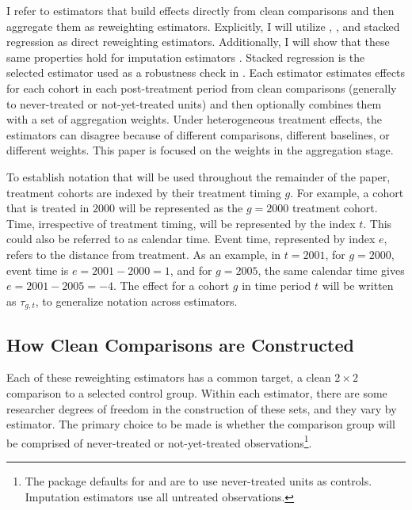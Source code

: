 \documentclass[12pt]{article}
\begin{document}
I refer to estimators that build effects directly from clean comparisons and then aggregate them as reweighting estimators. Explicitly, I will utilize \textcite{sun2021estimating}, \textcite{callaway2021difference}, and stacked regression \parencite{baker2022much, cengiz2019effect, wing2024stacked} as direct reweighting estimators. Additionally, I will show that these same properties hold for imputation estimators \parencite{gardner2022two, borusyak2024revisiting}. Stacked regression is the selected estimator used as a robustness check in \textcite{payson2025residency}. Each estimator estimates effects for each cohort in each post-treatment period from clean comparisons (generally to never-treated or not-yet-treated units) and then optionally combines them with a set of aggregation weights. Under heterogeneous treatment effects, the estimators can disagree because of different comparisons, different baselines, or different weights. This paper is focused on the weights in the aggregation stage.

To establish notation that will be used throughout the remainder of the paper, treatment cohorts are indexed by their treatment timing $g$. For example, a cohort that is treated in $2000$ will be represented as the $g = 2000$ treatment cohort. Time, irrespective of treatment timing, will be represented by the index $t$. This could also be referred to as calendar time. Event time, represented by index $e$, refers to the distance from treatment. As an example, in $t = 2001$, for $g = 2000$, event time is $e = 2001 - 2000 = 1$, and for $g = 2005$, the same calendar time gives $e = 2001 - 2005 = -4$. The effect for a cohort $g$ in time period $t$ will be written as $\tau_{g,t}$, to generalize notation across estimators.


\subsection{How Clean Comparisons are Constructed}\label{sec:cc_const}

Each of these reweighting estimators has a common target, a clean $2 \times 2$ comparison to a selected control group. Within each estimator, there are some researcher degrees of freedom in the construction of these sets, and they vary by estimator. The primary choice to be made is whether the comparison group will be comprised of never-treated or not-yet-treated observations\footnote{The package defaults for \textcite{callaway2021difference} and \textcite{sun2021estimating} are to use never-treated units as controls. Imputation estimators use all untreated observations.}.
\end{document}

